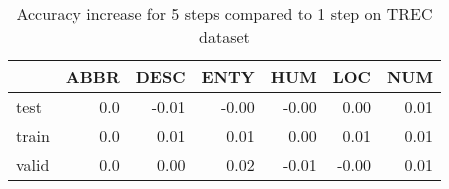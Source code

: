 \begin{table}[H]
\begin{center}

\begin{tabular}{lrrrrrr}
\toprule
{} &  ABBR &  DESC &  ENTY &  HUM &  LOC &  NUM \\
\midrule
test  &     0.0 &     -0.01 &     -0.00 &    -0.00 &     0.00 &     0.01 \\
train &     0.0 &      0.01 &      0.01 &     0.00 &     0.01 &     0.01 \\
valid &     0.0 &      0.00 &      0.02 &    -0.01 &    -0.00 &     0.01 \\
\bottomrule
\end{tabular}

\caption[Accuracy increase for 5 steps compared to 1 step on TREC dataset]{Accuracy increase for 5 steps compared to 1 step on TREC dataset}
\label{tab:multiw:trec:5}
\end{center}
\end{table}

